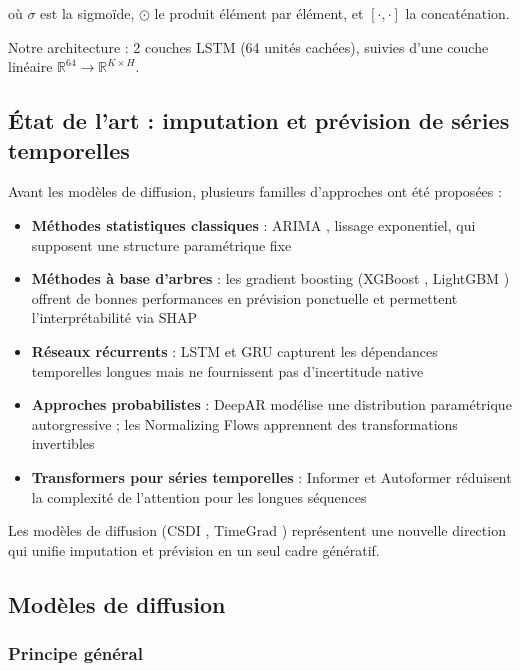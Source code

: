 \documentclass[12pt,a4paper]{article}
\newcommand{\R}{\mathbb{R}}
\begin{document}
o\`u $\sigma$ est la sigmo\"ide, $\odot$ le produit \'el\'ement par \'el\'ement, et $[\cdot, \cdot]$ la concat\'enation.

Notre architecture : 2 couches LSTM (64 unit\'es cach\'ees), suivies d'une couche lin\'eaire $\R^{64} \to \R^{K \times H}$.

\subsection{\'Etat de l'art : imputation et pr\'evision de s\'eries temporelles}

Avant les mod\`eles de diffusion, plusieurs familles d'approches ont \'et\'e propos\'ees :
\begin{itemize}
    \item \textbf{M\'ethodes statistiques classiques} : ARIMA \cite{box1970}, lissage exponentiel, qui supposent une structure param\'etrique fixe
    \item \textbf{M\'ethodes \`a base d'arbres} : les gradient boosting (XGBoost \cite{chen2016}, LightGBM \cite{ke2017}) offrent de bonnes performances en pr\'evision ponctuelle et permettent l'interpr\'etabilit\'e via SHAP
    \item \textbf{R\'eseaux r\'ecurrents} : LSTM \cite{hochreiter1997} et GRU capturent les d\'ependances temporelles longues mais ne fournissent pas d'incertitude native
    \item \textbf{Approches probabilistes} : DeepAR \cite{salinas2020} mod\'elise une distribution param\'etrique autorgressive ; les Normalizing Flows \cite{rasul2021} apprennent des transformations invertibles
    \item \textbf{Transformers pour s\'eries temporelles} : Informer \cite{zhou2021} et Autoformer r\'eduisent la complexit\'e de l'attention pour les longues s\'equences
\end{itemize}
Les mod\`eles de diffusion (CSDI \cite{tashiro2021}, TimeGrad \cite{rasul2021tg}) repr\'esentent une nouvelle direction qui unifie imputation et pr\'evision en un seul cadre g\'en\'eratif.

\subsection{Mod\`eles de diffusion}

\subsubsection{Principe g\'en\'eral}
\end{document}
